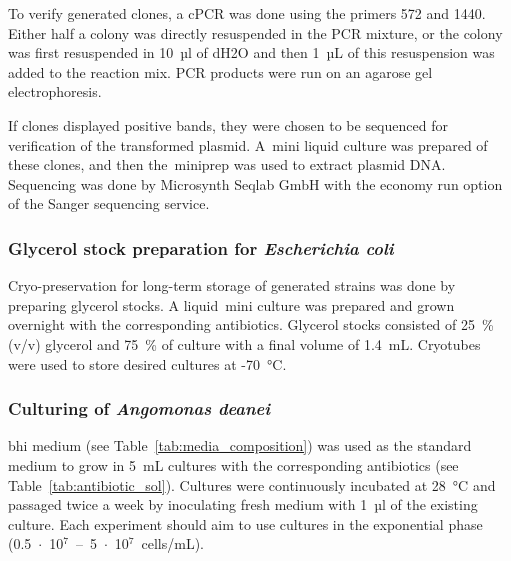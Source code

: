 \par To verify generated clones, a \gls{cPCR} was done using the primers 572 and 1440. Either half a colony was directly resuspended in the PCR mixture, or the colony was first resuspended in 10~µl of \gls{dH2O} and then 1~µL of this resuspension was added to the reaction mix. PCR products were run on an agarose gel electrophoresis.

\par If clones displayed positive bands, they were chosen to be sequenced for verification of the transformed plasmid. A~mini liquid culture was prepared of these clones, and then the~miniprep was used to extract plasmid DNA. Sequencing was done by Microsynth Seqlab GmbH with the economy run option of the Sanger sequencing service.
\subsubsection{Glycerol stock preparation for \textit{Escherichia coli}} \label{txt:Cryo_Eco}
Cryo-preservation for long-term storage of generated  strains was done by preparing glycerol stocks. A liquid~mini culture was prepared and grown overnight with the corresponding antibiotics. Glycerol stocks consisted of 25~\% (v/v) glycerol and 75~\% of  culture with a final volume of 1.4~mL. Cryotubes were used to store desired cultures at -70~°C.
\subsubsection{Culturing of \textit{Angomonas deanei}} \label{txt:Culture_Adea}
\Gls{bhi} medium (see Table~\ref{tab:media_composition}) was used as the standard medium to grow  in 5~mL cultures with the corresponding antibiotics (see Table~\ref{tab:antibiotic_sol}). Cultures were continuously incubated at 28~°C and passaged twice a week by inoculating fresh medium with 1~µl of the existing culture. Each experiment should aim to use cultures in the exponential phase (0.5~$\cdot$~10$^7$~--~5~$\cdot$~10$^7$~cells/mL).

